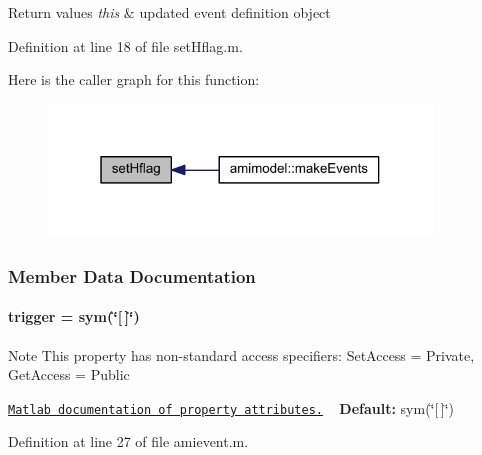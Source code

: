 \begin{DoxyRetVals}{Return values}
{\em this} & updated event definition object \\
\hline
\end{DoxyRetVals}


Definition at line 18 of file set\+Hflag.\+m.



Here is the caller graph for this function\+:\nopagebreak
\begin{figure}[H]
\begin{center}
\leavevmode
\includegraphics[width=289pt]{classamievent_ac3b640fb9f5aa45290aab37bec8d070f_icgraph}
\end{center}
\end{figure}




\subsubsection{Member Data Documentation}
\hypertarget{classamievent_ae194cb817eae4085f8023885100c68dd}{}
\paragraph[{trigger}]{\setlength{\rightskip}{0pt plus 5cm}trigger = sym(\char`\"{}\mbox{[}$\,$\mbox{]}\char`\"{})}\label{classamievent_ae194cb817eae4085f8023885100c68dd}
\begin{DoxyNote}{Note}
This property has non-\/standard access specifiers\+: {\ttfamily Set\+Access = Private, Get\+Access = Public} 

\href{http://www.mathworks.com/help/matlab/matlab_oop/property-attributes.html}{\tt Matlab documentation of property attributes.} ~\newline
{\bfseries Default\+:} sym(\char`\"{}\mbox{[}$\,$\mbox{]}\char`\"{}) 
\end{DoxyNote}


Definition at line 27 of file amievent.\+m.

\hypertarget{classamievent_ab9227561ac246ee4b70f9e65c25ffda7}{}
